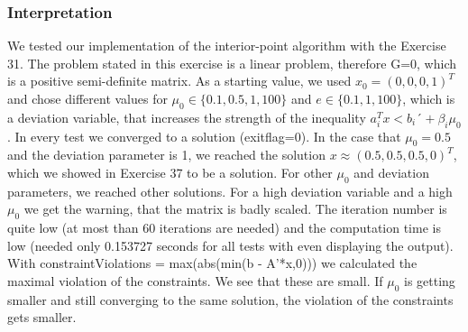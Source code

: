 \documentclass{article}
\begin{document}
\subsubsection{Interpretation}
We tested our implementation of the interior-point algorithm with the Exercise 31. The problem stated in this exercise is a linear problem, therefore G=0, which is a positive semi-definite matrix. As a starting value, we used $x_0=(0,0,0,1)^T$ and chose different values for $\mu_0 \in \{0.1,0.5,1,100\}$ and $e \in \{0.1,1,100\}$, which is a deviation variable, that increases the strength of the inequality $a_i^T x < b_i ´+ \beta_i \mu_0$. In every test we converged to a solution (exitflag=0). In the case that $\mu_0=0.5$ and the deviation parameter is 1, we reached the solution $x \approx (0.5,0.5,0.5,0)^T$, which we showed in Exercise 37 to be a solution. For other $\mu_0$ and deviation parameters, we reached other solutions. For a high deviation variable and a high $\mu_0$ we get the warning, that the matrix is badly scaled. The iteration number is quite low (at most than 60 iterations are needed) and the computation time is low (needed only 0.153727 seconds for all tests with even displaying the output). With  constraintViolations = max(abs(min(b - A'*x,0))) we calculated the maximal violation of the constraints. We see that these are small. If $\mu_0$ is getting smaller and still converging to the same solution, the violation of the constraints gets smaller.      
\end{document}
